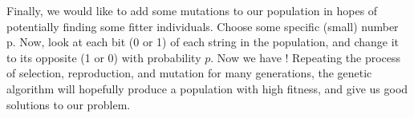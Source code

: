 Finally, we would like to add some mutations to our population in hopes of potentially finding some fitter individuals. Choose some specific (small) number p. Now, look at each bit (0 or 1) of each string in the population, and change it to its opposite (1 or 0) with probability $p$. Now we have ! Repeating the process of selection, reproduction, and mutation for many generations, the genetic algorithm will hopefully produce a population with high fitness, and give us good solutions to our problem. \\












